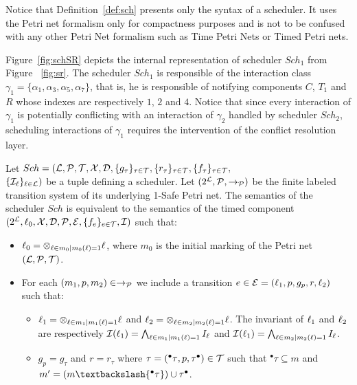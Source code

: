 Notice that Definition~\ref{def:sch} presents only the syntax of a scheduler. It uses 
the Petri net formalism only for compactness purposes and is not to be confused with 
any other Petri Net formalism such as Time Petri Nets or Timed Petri nets.

\begin{example}
  Figure~\ref{fig:schSR} depicts the internal representation of scheduler $Sch_1$ from Figure
  ~\ref{fig:sr}. The scheduler $Sch_1$ is responsible of the interaction class $\gamma_1=\{
    \alpha_1,\alpha_3,\alpha_5,\alpha_7\}$, that is, he is responsible of notifying components
  $C$, $T_1$ and $R$ whose indexes are respectively $1$, $2$ and $4$. Notice that since 
  every interaction of $\gamma_1$ is potentially conflicting with an interaction of $\gamma_2$
  handled by scheduler $Sch_2$, scheduling interactions of $\gamma_1$ requires the intervention
  of the conflict resolution layer.
\end{example}
\begin{property}\label{pr:sch_sr_sem}
  Let $Sch=(\mathcal{L}, \mathcal{P},\mathcal{T},\mathcal{X}, \mathcal{D},\{g_{\tau}\}_{\tau\in\mathcal{T}},\{r_{\tau}\}_{\tau\in\mathcal{T}},
    \{f_{\tau}\}_{\tau\in\mathcal{T}},$\\$\{\mathcal{I}_{\ell}\}_{\ell\in\mathcal{L}})$ be a tuple defining 
  a scheduler. Let $(2^{\mathcal{L}},\mathcal{P},\to_{\mathcal{P}})$ be the finite labeled transition
  system of its underlying 1-Safe Petri net. The semantics of the scheduler $Sch$ 
  is equivalent to the semantics of the timed component 
  $(2^{\mathcal{L}},\ell_0,\mathcal{X},\mathcal{D},\mathcal{P},\mathcal{E},\{f_{e}\}_{e\in\mathcal{T}},\mathcal{I})$ such that:
  \begin{itemize}
    \item $\ell_0=\otimes_{\ell\in m_0|m_0(\ell)=1}\ell$, where $m_0$ is the initial marking 
      of the Petri net $(\mathcal{L}, \mathcal{P},\mathcal{T})$.
    \item For each $(m_1,p,m_2)\in\to_{\mathcal{P}}$ we include a transition $e\in\mathcal{E}=
      (\ell_1,p,g_p,r,\ell_2)$ such that:
      \begin{itemize}
        \item $\ell_1=\otimes_{\ell\in m_1|m_1(\ell)=1}\ell$ and
              $\ell_2=\otimes_{\ell\in m_2|m_2(\ell)=1}\ell$. The invariant of $\ell_1$ and 
              $\ell_2$ are respectively 
              $\mathcal{I}(\ell_1)=\bigwedge_{\ell\in m_1|m_1(\ell)=1}I_{\ell}$ and
              $\mathcal{I}(\ell_1)=\bigwedge_{\ell\in m_2|m_2(\ell)=1}I_{\ell}$.
            \item $g_p=g_{\tau}$ and $r=r_{\tau}$ where 
              $\tau=({^\bullet\tau},p,{\tau^\bullet })\in\mathcal{T}$ such that
            ${^\bullet\tau}\subseteq m$ and $m'=(m\textbackslash{^\bullet\tau})
  \cup{\tau^\bullet }$.
      \end{itemize}
  \end{itemize}
\end{property}



